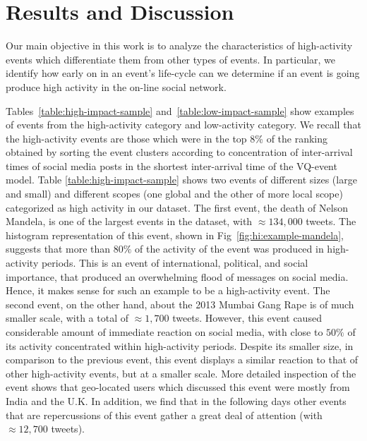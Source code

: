 \section{Results and Discussion}

Our main objective in this work is to analyze the characteristics of
high-activity events which differentiate them from other types of events. 
%
In particular, we identify how early on in an event's life-cycle can we determine
if an event is going produce high activity in the on-line social network.




Tables~\ref{table:high-impact-sample} and~\ref{table:low-impact-sample} show
examples of events from the high-activity category and low-activity category. 
%
We recall that the high-activity events are those which were in the top 8\% of
the ranking obtained by sorting the event clusters according to concentration of
inter-arrival times of social media posts in the shortest inter-arrival time of
the VQ-event model.  
%
Table \ref{table:high-impact-sample} shows two events of different sizes (large
and small) and different scopes (one global and the other of more local scope)
categorized as high activity in our dataset. 
%
The first event, the death of Nelson Mandela, is one of the largest events in
the dataset, with $\approx 134,000$ tweets. 
%
The histogram representation of this event, shown in
Fig~\ref{fig:hi:example-mandela}, suggests that more than $80\%$ of the activity
of the event was produced in high-activity periods.
%
This is an event of international, political, and social importance, that
produced an overwhelming flood of messages on social media. %
%
Hence, it makes sense for such an example to be a high-activity event. 
%
The second event, on the other hand, about the 2013 Mumbai Gang Rape is of much
smaller scale, with a total of $\approx 1,700$ tweets. 
%
However, this event caused considerable amount of immediate reaction on social
media, with close to $50\%$ of its activity concentrated within high-activity
periods. 
%
Despite its smaller size, in comparison to the previous event, this event
displays a similar reaction to that of other high-activity events, but at a
smaller scale. 
%
More detailed inspection of the event shows that geo-located users which
discussed this event were mostly from India and the U.K. 
%
In addition, we find that in the following days other events that are
repercussions of this event gather a great deal of attention (with $\approx
12,700$ tweets).



